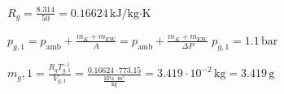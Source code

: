 \( R_g = \frac{8.314}{50} = 0.16624 \, \text{kJ/kg·K} \)  

\( p_{g,1} = p_{\text{amb}} + \frac{m_K + m_{\text{EW}}}{A} = p_{\text{amb}} + \frac{m_K + m_{\text{EW}}}{\Delta P} \)  
\( p_{g,1} = 1.1 \, \text{bar} \)  

\( m_g,1 = \frac{R_g T_{g,1}^{-1}}{V_{g,1}} = \frac{0.16624 \cdot 773.15}{\frac{\text{kPa} \cdot \text{m}^3}{\text{kg}}} = 3.419 \cdot 10^{-2} \, \text{kg} = 3.419 \, \text{g} \)